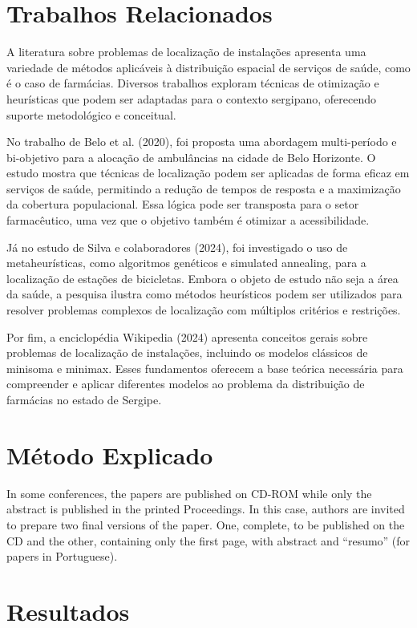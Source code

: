 \documentclass[12pt]{article}
\begin{document}
\section{Trabalhos Relacionados}

A literatura sobre problemas de localização de instalações apresenta uma variedade de métodos aplicáveis à distribuição espacial de serviços de saúde, como é o caso de farmácias. Diversos trabalhos exploram técnicas de otimização e heurísticas que podem ser adaptadas para o contexto sergipano, oferecendo suporte metodológico e conceitual.

No trabalho de Belo et al. (2020), foi proposta uma abordagem multi-período e bi-objetivo para a alocação de ambulâncias na cidade de Belo Horizonte. O estudo mostra que técnicas de localização podem ser aplicadas de forma eficaz em serviços de saúde, permitindo a redução de tempos de resposta e a maximização da cobertura populacional. Essa lógica pode ser transposta para o setor farmacêutico, uma vez que o objetivo também é otimizar a acessibilidade.

Já no estudo de Silva e colaboradores (2024), foi investigado o uso de metaheurísticas, como algoritmos genéticos e simulated annealing, para a localização de estações de bicicletas. Embora o objeto de estudo não seja a área da saúde, a pesquisa ilustra como métodos heurísticos podem ser utilizados para resolver problemas complexos de localização com múltiplos critérios e restrições.

Por fim, a enciclopédia Wikipedia (2024) apresenta conceitos gerais sobre problemas de localização de instalações, incluindo os modelos clássicos de minisoma e minimax. Esses fundamentos oferecem a base teórica necessária para compreender e aplicar diferentes modelos ao problema da distribuição de farmácias no estado de Sergipe.

\section{Método Explicado}

In some conferences, the papers are published on CD-ROM while only the
abstract is published in the printed Proceedings. In this case, authors are
invited to prepare two final versions of the paper. One, complete, to be
published on the CD and the other, containing only the first page, with
abstract and ``resumo'' (for papers in Portuguese).

\section{Resultados}
\end{document}
